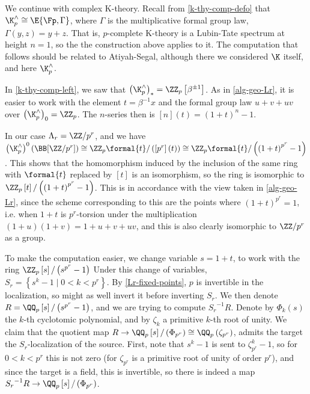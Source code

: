 \begin{example}\label{k-thy-Lr}
	We continue with complex K-theory.
	Recall from \ref{k-thy-comp-defo} that $\K_p^\wedge \cong \E{\Fp, \Gamma}$, where $\Gamma$ is the multiplicative formal group law, $\Gamma\left(y,z\right) = y + z$.
	That is, $p$-complete K-theory is a Lubin-Tate spectrum at height $n = 1$, so the the construction above applies to it.
	The computation that follows should be related to Atiyah-Segal, although there we considered $\K$ itself, and here $\K_p^\wedge$.
	
	In \ref{k-thy-comp-left}, we saw that $\left(\K_p^\wedge\right)_* = \ZZ_p\left[\beta^{\pm 1}\right]$.
	As in \ref{alg-geo-Lr}, it is easier to work with the element $t = \beta^{-1} x$ and the formal group law $u + v + uv$ over $\left(\K_p^\wedge\right)_0 = \ZZ_p$.
	The $n$-series then is $\left[n\right]\left(t\right) = \left(1 + t\right)^n - 1$.
	
	In our case $\Lambda_r = \ZZ/p^r$, and we have
	$
	\left(\K_p^\wedge\right)^0\left(\BB[\ZZ/p^r]\right)
	\cong \ZZ_p\formal{t}/\left(\left[p^r\right]\left(t\right)\right)
	\cong \ZZ_p\formal{t}/\left(\left(1 + t\right)^{p^r} - 1\right)
	$.
	This shows that the homomorphism induced by the inclusion of the same ring with $\formal{t}$ replaced by $\left[t\right]$ is an isomorphism, so the ring is isomorphic to
	$\ZZ_p\left[t\right]/\left(\left(1 + t\right)^{p^r} - 1\right)$.
	This is in accordance with the view taken in \ref{alg-geo-Lr}, since the scheme corresponding to this are the points where $\left(1 + t\right)^{p^r} = 1$, i.e. when $1 + t$ is $p^r$-torsion under the multiplication $\left(1+u\right)\left(1+v\right) = 1+u+v+uv$, and this is also clearly isomorphic to $\ZZ/p^r$ as a group.
	
	To make the computation easier, we change variable $s = 1+t$, to work with the ring
	$\ZZ_p\left[s\right]/\left(s^{p^r} - 1\right)$
	Under this change of variables, $S_r = \left\{s^k - 1 \mid 0 < k < p^r\right\}$.
	By \ref{Lr-fixed-points}, $p$ is invertible in the localization, so might as well invert it before inverting $S_r$.
	We then denote $R = \QQ_p\left[s\right]/\left(s^{p^r} - 1\right)$, and we are trying to compute ${S_r}^{-1} R$.
	Denote by $\Phi_k\left(s\right)$ the $k$-th cyclotomic polynomial, and by $\zeta_k$ a primitive $k$-th root of unity.
	We claim that the quotient map $R \to \QQ_p\left[s\right]/\left(\Phi_{p^r}\right) \cong \QQ_p\left(\zeta_{p^r}\right)$, admits the target the $S_r$-localization of the source.
	First, note that $s^k-1$ is sent to $\zeta_{p^r}^k - 1$, so for $0 < k < p^r$ this is not zero (for $\zeta_{p^r}$ is a primitive root of unity of order $p^r$), and since the target is a field, this is invertible, so there is indeed a map ${S_r}^{-1} R \to \QQ_p\left[s\right]/\left(\Phi_{p^r}\right)$.
	

\end{example}
